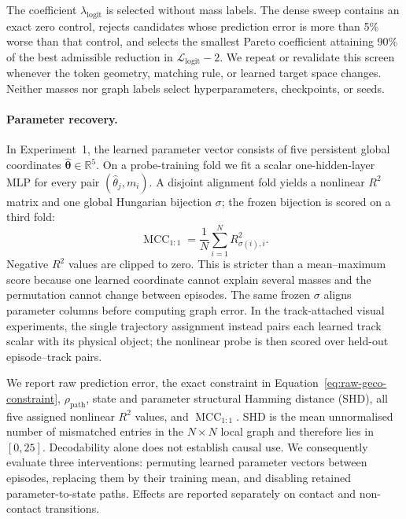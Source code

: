 The coefficient $\lambda_{\mathrm{logit}}$ is selected without mass labels.  The dense sweep
contains an exact zero control, rejects candidates whose prediction error is more than 5\% worse
than that control, and selects the smallest Pareto coefficient attaining 90\% of the best
admissible reduction in $\mathcal{L}_{\mathrm{logit}}-2$.  We repeat or revalidate this screen
whenever the token geometry, matching rule, or learned target space changes.  Neither masses nor
graph labels select hyperparameters, checkpoints, or seeds.

\paragraph{Parameter recovery.}
In Experiment~1, the learned parameter vector consists of five persistent global coordinates
$\widehat{\boldsymbol\theta}\in\mathbb{R}^{5}$.  On a probe-training fold we fit a scalar
one-hidden-layer MLP for every pair $(\widehat\theta_j,m_i)$.  A disjoint alignment fold yields
a nonlinear $R^2$ matrix and one global Hungarian bijection $\sigma$; the frozen bijection is
scored on a third fold:
\begin{equation}
    \operatorname{MCC}_{1:1}
      =\frac{1}{N}\sum_{i=1}^{N}R^2_{\sigma(i),i}.
    \label{eq:strict-mcc}
\end{equation}
Negative $R^2$ values are clipped to zero.  This is stricter than a mean--maximum score because
one learned coordinate cannot explain several masses and the permutation cannot change between
episodes.  The same frozen $\sigma$ aligns parameter columns before computing graph error.  In
the track-attached visual experiments, the single trajectory assignment instead pairs each
learned track scalar with its physical object; the nonlinear probe is then scored over held-out
episode--track pairs.

We report raw prediction error, the exact constraint in
Equation~\eqref{eq:raw-geco-constraint}, $\rho_{\mathrm{path}}$, state and parameter structural
Hamming distance (SHD), all five assigned nonlinear $R^2$ values, and
$\operatorname{MCC}_{1:1}$.  SHD is the mean unnormalised number of mismatched entries in the
$N\times N$ local graph and therefore lies in $[0,25]$.  Decodability alone does not establish
causal use.  We consequently evaluate three interventions: permuting learned parameter vectors
between episodes, replacing them by their training mean, and disabling retained
parameter-to-state paths.  Effects are reported separately on contact and non-contact
transitions.

